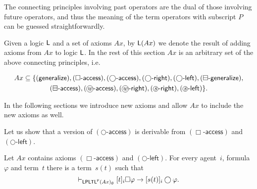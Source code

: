 \documentclass[envcountsect,envcountsame,oribibl,orivec]{llncs}
\newcommand*\circled[1]{\tikz[baseline=(char.base)]{
		\node[shape=circle,draw,inner sep=0.4pt] (char) {#1};}}
\newcommand{\limplies}{\rightarrow}
\newcommand{\lnext}{\bigcirc}
\newcommand{\lalways}{\Box}
\newcommand{\lsofar}{\boxminus}
\newcommand{\wprevious}{\circled{\textit{w}}}
\newcommand{\sprevious}{\circled{\textit{s}}}
\newcommand{\LPLTLp}{\textsf{LPLTL}^{\sf P}}
\newcommand{\jbox}[1]{\left[#1\right]\!}
\newcommand{\agent}{i}
\newcommand{\alwaysaccessprinciple}{\ensuremath{(\lalways\textsf{-access})}}
\newcommand{\generalizeprinciple}{\ensuremath{(\textsf{generalize})}}
\newcommand{\nextaccessprinciple}{\ensuremath{(\lnext\textsf{-access})}}
\newcommand{\nextrightshiftprinciple}{\ensuremath{(\lnext\textsf{-right})}}
\newcommand{\nextleftshiftprinciple}{\ensuremath{(\lnext\textsf{-left})}}
\newcommand{\pastgeneralizeprinciple}{\ensuremath{(\lsofar\textsf{-generalize})}}
\newcommand{\pastaccessprinciple}{\ensuremath{(\lsofar\textsf{-access})}}
\newcommand{\wprevaccessprinciple}{\ensuremath{(\wprevious\textsf{-access})}}
\newcommand{\wprevrightshiftprinciple}{\ensuremath{(\wprevious\textsf{-right})}}
\newcommand{\sprevrightshiftprinciple}{\ensuremath{(\sprevious\textsf{-right})}}
\newcommand{\sprevleftshiftprinciple}{\ensuremath{(\sprevious\textsf{-left})}}
\renewcommand{\phi}{\varphi}
\begin{document}
The connecting principles involving past operators are the dual of those involving future operators, and thus the meaning of the term operators with subscript $P$ can be guessed straightforwardly. 

Given a logic ${\sf L}$ and a set of axioms $Ax$, by ${\sf L}(Ax)$ we denote the result of adding axioms  from $Ax$ to logic ${\sf L}$. In the rest of this section $Ax$ is an arbitrary set of the above connecting principles, i.e.


\begin{gather*}
Ax \subseteq \{ \generalizeprinciple, \alwaysaccessprinciple, \nextaccessprinciple, \nextrightshiftprinciple, \nextleftshiftprinciple, 
\pastgeneralizeprinciple,\\ \pastaccessprinciple, \wprevaccessprinciple, \wprevrightshiftprinciple, \sprevrightshiftprinciple, \sprevleftshiftprinciple \}.
\end{gather*}

In the following sections we introduce new axioms and allow $Ax$ to include the new axioms as well.


%
%
%
%



Let us show that a version of $\nextaccessprinciple$ is derivable from $\alwaysaccessprinciple$ and $\nextleftshiftprinciple$.

\begin{lemma}
	Let $Ax$ contains axioms $\alwaysaccessprinciple$ and $\nextleftshiftprinciple$. For every agent~$\agent$, formula~$\phi$ and term~$t$ there is a term~$s(t)$ such that
	\[
	\vdash_{\LPLTLp(Ax)_\emptyset} \jbox{t}_\agent \lalways \phi \limplies \jbox{s(t)}_\agent \lnext \phi.
	\]
\end{lemma}
\end{document}
